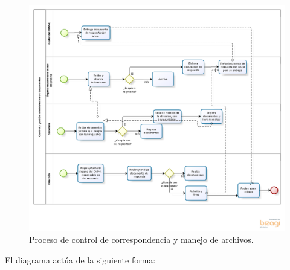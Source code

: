 	\begin{figure}[htbp!]
		\centering
			\includegraphics[width=1.2\textwidth]{images/diagramacmpl.png}
		\caption{Proceso de control de correspondencia y manejo de archivos.}
		\label{fig:FlujoCMPL}
	\end{figure}
	
	El diagrama actúa de la siguiente forma:
	
